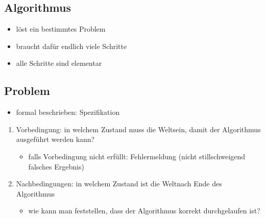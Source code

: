 \documentclass[11pt, fleqn]{scrreprt}
\begin{document}
\subsection*{Algorithmus}
    \begin{itemize}[label={-}]
        \item löst ein bestimmtes Problem
        \item braucht dafür endlich viele Schritte
        \item alle Schritte sind elementar
    \end{itemize}


\subsection*{Problem}
    \begin{itemize}[label={-}]
        \item formal beschrieben: Spezifikation
    \end{itemize}

    \medskip


    \begin{enumerate}
        \item Vorbedingung: in welchem Zustand muss die \glqq Welt\grqq sein, damit der Algorithmus ausgeführt werden kann?
        \begin{itemize}[label={$\rightarrow$}]
            \item falls Vorbedingung nicht erfüllt: Fehlermeldung (nicht stillschweigend falsches Ergebnis)
        \end{itemize}
        \item Nachbedingungen: in welchem Zustand ist die \glqq Welt\grqq nach Ende des Algorithmus
        \begin{itemize}[label={$\rightarrow$}]
            \item wie kann man feststellen, dass der Algorithmus korrekt durchgelaufen ist?
        \end{itemize}
    \end{enumerate}

    \medskip
\end{document}
